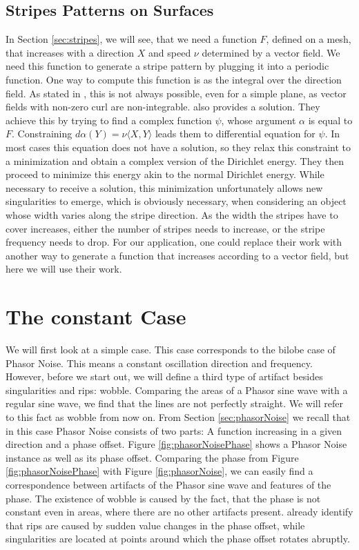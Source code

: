 \documentclass{utue} %
\begin{document}
\subsection{Stripes Patterns on Surfaces}
In Section \ref{sec:stripes}, we will see, that we need a function $F$, defined on a mesh, that increases with a direction $X$ and speed $\nu$ determined by a vector field. We need this function to generate a stripe pattern by plugging it into a periodic function. One way to compute this function is as the integral over the direction field. As stated in \cite{stripes}, this is not always possible, even for a simple plane, as vector fields with non-zero curl are non-integrable. \cite{stripes} also provides a solution. They achieve this by trying to find a complex function $\psi$, whose argument $\alpha$ is equal to $F$. Constraining $d\alpha(Y) = \nu\langle X,Y\rangle$ leads them to differential equation for $\psi$. In most cases this equation does not have a solution, so they relax this constraint to a minimization and obtain a complex version of the Dirichlet energy. They then proceed to minimize this energy akin to the normal Dirichlet energy. While necessary to receive a solution, this minimization unfortunately allows new singularities to emerge, which is obviously necessary, when considering an object whose width varies along the stripe direction. As the width the stripes have to cover increases, either the number of stripes needs to increase, or the stripe frequency needs to drop. For our application, one could replace their work with another way to generate a function that increases according to a vector field, but here we will use their work.

\section{The constant Case}
We will first look at a simple case. This case corresponds to the bilobe case of Phasor Noise. This means a constant oscillation direction and frequency. However, before we start out, we will define a third type of artifact besides singularities and rips: wobble. Comparing the areas of a Phasor sine wave with a regular sine wave, we find that the lines are not perfectly straight. We will refer to this fact as wobble from now on. From Section \ref{sec:phasorNoise} we recall that in this case Phasor Noise consists of two parts: A function increasing in a given direction and a phase offset. Figure \ref{fig:phasorNoisePhase} shows a Phasor Noise instance as well as its phase offset. Comparing the phase from Figure \ref{fig:phasorNoisePhase} with Figure \ref{fig:phasorNoise}, we can easily find a correspondence between artifacts of the Phasor sine wave and features of the phase. The existence of wobble is caused by the fact, that the phase is not constant even in areas, where there are no other artifacts present. \citeauthor{phasorNoise} already identify that rips are caused by sudden value changes in the phase offset, while singularities are located at points around which the phase offset rotates abruptly.\\
\end{document}
